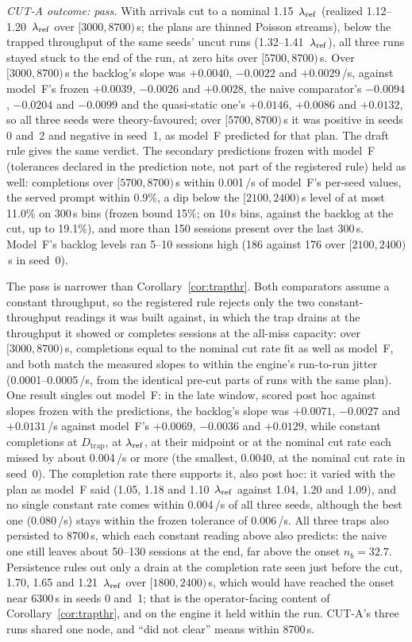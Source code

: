 \begin{itemize}[leftmargin=*,nosep]
\emph{CUT-A outcome: pass.} With arrivals cut to a nominal 1.15~$\lambda_{\mathrm{ref}}$ (realized 1.12--1.20~$\lambda_{\mathrm{ref}}$ over $[3000,8700)$\,s; the
plans are thinned Poisson streams), below the trapped throughput of the same seeds' uncut runs (1.32--1.41~$\lambda_{\mathrm{ref}}$), all three runs
stayed stuck to the end of the run, at zero hits over $[5700,8700)$\,s. Over $[3000,8700)$\,s the backlog's slope was $+0.0040$,
$-0.0022$ and $+0.0029$\,/s, against model~F's frozen $+0.0039$, $-0.0026$ and $+0.0028$, the naive comparator's $-0.0094$, $-0.0204$
and $-0.0099$ and the quasi-static one's $+0.0146$, $+0.0086$ and $+0.0132$, so all three seeds were theory-favoured; over
$[5700,8700)$\,s it was positive in seeds 0 and~2 and negative in seed~1, as model~F predicted for that plan. The draft rule gives
the same verdict. The secondary predictions frozen with model~F (tolerances declared in the prediction note, not part of the registered
rule) held as well: completions over $[5700,8700)$\,s within 0.001\,/s of model~F's per-seed values, the served prompt within 0.9\%, a
dip below the $[2100,2400)$\,s level of at most 11.0\% on 300\,s bins (frozen bound 15\%; on 10\,s bins, against the backlog at the
cut, up to 19.1\%), and more than 150 sessions present over the last 300\,s. Model~F's backlog levels ran 5--10 sessions high (186
against 176 over $[2100,2400)$\,s in seed~0).

The pass is narrower than Corollary~\ref{cor:trapthr}. Both comparators assume a constant throughput, so the registered rule
rejects only the two constant-throughput readings it was built against, in which the trap drains at the throughput it showed or completes sessions at
the all-miss capacity: over $[3000,8700)$\,s, completions equal to the nominal cut rate fit as well as model~F, and both match the
measured slopes to within the engine's run-to-run jitter (0.0001--0.0005\,/s, from the identical pre-cut parts of runs with the same
plan). One result singles out model~F: in the late window, scored post hoc against slopes frozen with the predictions, the
backlog's slope was $+0.0071$, $-0.0027$ and $+0.0131$\,/s against model~F's $+0.0069$, $-0.0036$ and $+0.0129$, while constant
completions at $D_{\mathrm{trap}}$, at $\lambda_{\mathrm{ref}}$, at their midpoint or at the nominal cut rate each missed by about 0.004\,/s or more
(the smallest, 0.0040, at the nominal cut rate in seed~0). The completion rate there supports it, also post hoc: it varied with the
plan as model~F said (1.05, 1.18 and 1.10~$\lambda_{\mathrm{ref}}$ against 1.04, 1.20 and 1.09), and no single constant rate comes within 0.004\,/s
of all three seeds, although the best one (0.080\,/s) stays within the frozen tolerance of 0.006\,/s. All three traps also
persisted to 8700\,s, which each constant reading above also predicts: the naive one still leaves about 50--130 sessions at the end,
far above the onset $n_b=32.7$. Persistence rules out only a drain at the completion rate seen just before the cut, 1.70, 1.65 and
1.21~$\lambda_{\mathrm{ref}}$ over $[1800,2400)$\,s, which would have reached the onset near 6300\,s in seeds 0 and~1; that is the operator-facing
content of Corollary~\ref{cor:trapthr}, and on the engine it held within the run. CUT-A's three runs shared one node, and ``did not
clear'' means within 8700\,s.


\end{itemize}
